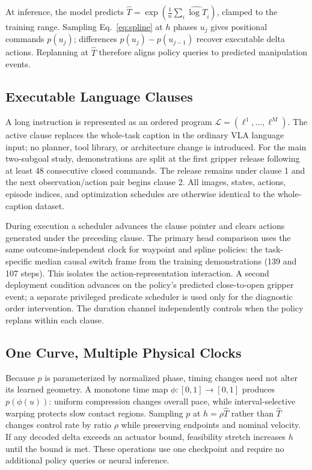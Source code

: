 At inference, the model predicts $\hat T=\exp(\frac{1}{n}\sum_i\widehat{\log T}_i)$, clamped to the training range. Sampling Eq.~\eqref{eq:spline} at $h$ phases $u_j$ gives positional commands $p(u_j)$; differences $p(u_j)-p(u_{j-1})$ recover executable delta actions. Replanning at $\hat T$ therefore aligns policy queries to predicted manipulation events.

\subsection{Executable Language Clauses}

A long instruction is represented as an ordered program $\mathcal{L}=(\ell^1,\ldots,\ell^M)$. The active clause replaces the whole-task caption in the ordinary VLA language input; no planner, tool library, or architecture change is introduced. For the main two-subgoal study, demonstrations are split at the first gripper release following at least 48 consecutive closed commands. The release remains under clause 1 and the next observation/action pair begins clause 2. All images, states, actions, episode indices, and optimization schedules are otherwise identical to the whole-caption dataset.

During execution a scheduler advances the clause pointer and clears actions generated under the preceding clause. The primary head comparison uses the same outcome-independent clock for waypoint and spline policies: the task-specific median causal switch frame from the training demonstrations (139 and 107 steps). This isolates the action-representation interaction. A second deployment condition advances on the policy's predicted close-to-open gripper event; a separate privileged predicate scheduler is used only for the diagnostic order intervention. The duration channel independently controls when the policy replans within each clause.

\subsection{One Curve, Multiple Physical Clocks}

Because $p$ is parameterized by normalized phase, timing changes need not alter its learned geometry. A monotone time map $\phi:[0,1]\!\rightarrow\![0,1]$ produces $p(\phi(u))$: uniform compression changes overall pace, while interval-selective warping protects slow contact regions. Sampling $p$ at $h=\rho\hat T$ rather than $\hat T$ changes control rate by ratio $\rho$ while preserving endpoints and nominal velocity. If any decoded delta exceeds an actuator bound, feasibility stretch increases $h$ until the bound is met. These operations use one checkpoint and require no additional policy queries or neural inference.
